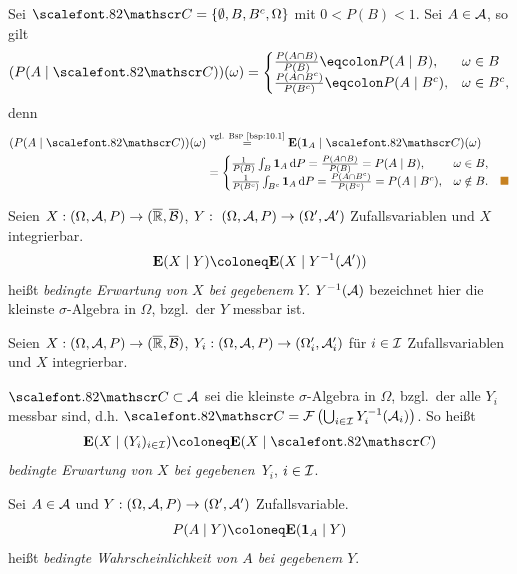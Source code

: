 \begin{bsp}
\label{bsp:10.2}
Sei ${\CC} = \setd{\emptyset,B,B^ {c},\Omega}$ mit $0< P(B) < 1$. Sei
$A\in\AA$, so gilt
\begin{align*}
(P(A\mid {\CC}))(\omega )=
\begin{cases}
\frac{P(A\cap B)}{P(B)}\defr P(A\mid B), & \omega \in B\\
\frac{P(A\cap B^{c})}{P(B^ {c})}\defr P(A\mid B^c), &
\omega \in B^ {c},
\end{cases}
\end{align*}
denn
\begin{align*}
(P(A\mid {\CC}))(\omega) &\overset{\text{vgl. \textsc{Bsp} \ref{bsp:10.1}}}{=}
\E(\Id_A\mid\CC)(\omega) \\
&=
\begin{cases}
\frac{1}{P(B)}\int_B \Id_A \dP = \frac{P(A\cap B)}{P(B)} = P(A\mid B), &
\omega\in B,\\
\frac{1}{P(B^c)}\int_{B^c} \Id_A \dP = \frac{P(A\cap B^c)}{P(B^c)} = P(A\mid
B^c), &\omega\notin B.\bsphere
\end{cases} 
\end{align*}
\end{bsp}

\begin{defn}
\label{defn:10.3}
\begin{defnenum}
\item
Seien $X:(\Omega, {\AA}, P) \to (\RA,\overline{\BB})$, $Y:~(\Omega, {\AA},  P)
\to (\Omega', {\AA}')$ Zufallsvariablen und $X$ integrierbar.
\begin{align*}
\E(X\mid Y)\defl\E(X\mid {Y^ {-1} ({\AA}')})
\end{align*}
heißt \emph{bedingte Erwartung von $X$ bei
gegebenem $Y$}.
$Y^{-1}(\AA)$ bezeichnet hier die kleinste $\sigma$-Algebra in $\Omega$, bzgl.\
der $Y$ messbar ist.
\item
Seien $X : (\Omega, {\AA}, P) \to (\RA,\overline{\BB})$,  
$Y_{i} : (\Omega, {\AA}, P)\to (\Omega'_{i}, {\AA}'_{i})$ für $i\in\II$
Zufallsvariablen und $X$ integrierbar. 

$\CC \subset {\AA}$ sei die kleinste $\sigma$-Algebra in $\Omega $, bzgl.\ der
alle $Y_{i}$ messbar sind, d.h.
${\CC}= {\FF} \left(\bigcup_{i\in\II} Y^ {-1}_{i}  ({\AA}_{i})\right)$. So heißt
\begin{align*}
\E(X\mid (Y_{i})_{i\in\II}) \defl \E(X\mid {\CC})
\end{align*}
\emph{bedingte Erwartung von $X$ bei
gegebenen~$Y_{i}$}, $i\in\II$.
\item
Sei $A\in {\AA}$ und $Y: (\Omega, {\AA}, P) \to (\Omega' ,
{\AA}')$ Zufallsvariable.
\begin{align*}
P(A\mid Y) \defl \E(\Id_{A}\mid Y)
\end{align*}
heißt \emph{bedingte Wahrscheinlichkeit von $A$ bei
gegebenem $Y$}.\fishhere
\end{defnenum}
\end{defn}

